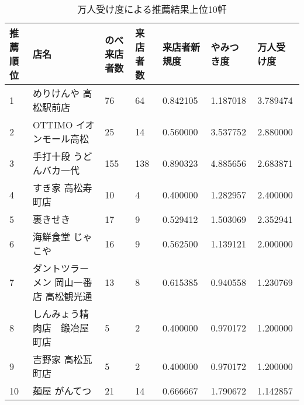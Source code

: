 \begin{table}[]
\caption{万人受け度による推薦結果上位10軒}
\label{table::ban}
\begin{tabular}{|l|l|l|l|l|l|l|}
\hline
推薦順位 & 店名                   & のべ来店者数 & 来店者数 & 来店者新規度   & やみつき度    & 万人受け度    \\ \hline
1    & めりけんや 高松駅前店          & 76     & 64   & 0.842105 & 1.187018 & 3.789474 \\ \hline
2    & OTTIMO イオンモール高松      & 25     & 14   & 0.560000 & 3.537752 & 2.880000 \\ \hline
3    & 手打十段 うどんバカ一代         & 155    & 138  & 0.890323 & 4.885656 & 2.683871 \\ \hline
4    & すき家 高松寿町店            & 10     & 4    & 0.400000 & 1.282957 & 2.400000 \\ \hline
5    & 裏きせき                 & 17     & 9    & 0.529412 & 1.503069 & 2.352941 \\ \hline
6    & 海鮮食堂 じゃこや            & 16     & 9    & 0.562500 & 1.139121 & 2.000000 \\ \hline
7    & ダントツラーメン 岡山一番店 高松観光通 & 13     & 8    & 0.615385 & 0.940558 & 1.230769 \\ \hline
8    & しんみょう精肉店　鍛冶屋町店       & 5      & 2    & 0.400000 & 0.970172 & 1.200000 \\ \hline
9    & 吉野家 高松瓦町店            & 5      & 2    & 0.400000 & 0.970172 & 1.200000 \\ \hline
10   & 麺屋 がんてつ              & 21     & 14   & 0.666667 & 1.790672 & 1.142857 \\ \hline
\end{tabular}
\end{table}
